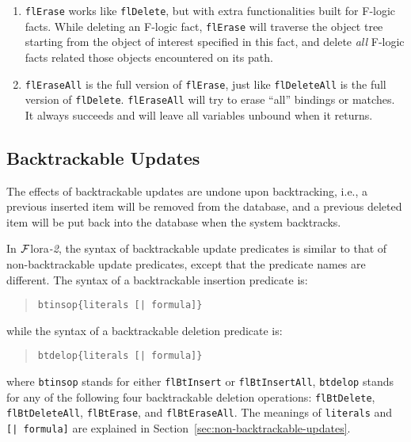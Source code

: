 \documentclass[11pt]{article}
\newcommand{\FLORA}{{\mbox{${\cal F}${\sc lora}\rm\emph{-2}}}\xspace}
\newcommand{\fl}{\mbox{F-logic}\xspace}
\begin{document}
\begin{enumerate}
\item {\tt flErase} works like {\tt flDelete}, but with extra functionalities
      built for \fl facts. While deleting an \fl fact, {\tt flErase}
      will traverse the object tree starting from the object of
      interest specified in this fact, and delete \emph{all} \fl facts
      related those objects encountered on its path.

\item {\tt flEraseAll} is the full version of {\tt flErase}, just like {\tt flDeleteAll}
      is the full version of {\tt flDelete}. {\tt flEraseAll} will try to erase
      ``all'' bindings or matches. It always succeeds and will leave all
      variables unbound when it returns.
\end{enumerate}


\subsection{Backtrackable Updates}


%
The effects of backtrackable updates are undone upon backtracking,
i.e., a previous inserted item will be removed from the database, and
a previous deleted item will be put back into the database when the
system backtracks.

%
In \FLORA, the syntax of backtrackable update predicates is similar
to that of non-backtrackable update predicates, except that the
predicate names are different. The syntax of a backtrackable insertion
predicate is:
\begin{quote}
\begin{verbatim}
btinsop{literals [| formula]}
\end{verbatim}
\end{quote}
while the syntax of a backtrackable deletion predicate is:
\begin{quote}
\begin{verbatim}
btdelop{literals [| formula]}
\end{verbatim}
\end{quote}
where {\tt btinsop} stands for either {\tt flBtInsert} or {\tt flBtInsertAll},
{\tt btdelop} stands for any of the following four backtrackable
deletion operations: {\tt flBtDelete}, {\tt flBtDeleteAll}, {\tt flBtErase}, and
{\tt flBtEraseAll}. The meanings of {\tt literals} and {\tt [| formula]} are
explained in Section~\ref{sec:non-backtrackable-updates}.
\end{document}
